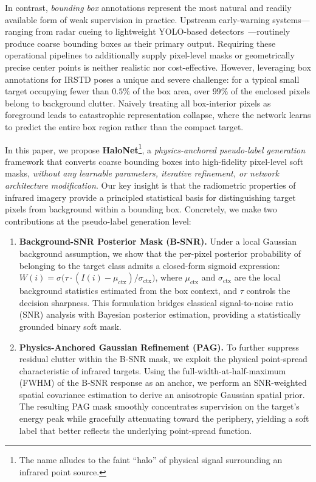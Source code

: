 In contrast, \emph{bounding box} annotations represent the most natural and readily available form of weak supervision in practice.
Upstream early-warning systems---ranging from radar cueing to lightweight YOLO-based detectors~\cite{yolo}---routinely produce coarse bounding boxes as their primary output.
Requiring these operational pipelines to additionally supply pixel-level masks or geometrically precise center points is neither realistic nor cost-effective.
However, leveraging box annotations for IRSTD poses a unique and severe challenge: for a typical small target occupying fewer than $0.5\%$ of the box area, over $99\%$ of the enclosed pixels belong to background clutter.
Naively treating all box-interior pixels as foreground leads to catastrophic representation collapse, where the network learns to predict the entire box region rather than the compact target.


In this paper, we propose \textbf{HaloNet}\footnote{The name alludes to the faint ``halo'' of physical signal surrounding an infrared point source.}, a \emph{physics-anchored pseudo-label generation} framework that converts coarse bounding boxes into high-fidelity pixel-level soft masks, \emph{without any learnable parameters, iterative refinement, or network architecture modification}.
Our key insight is that the radiometric properties of infrared imagery provide a principled statistical basis for distinguishing target pixels from background within a bounding box.
Concretely, we make two contributions at the pseudo-label generation level:

\begin{enumerate}
    \item \textbf{Background-SNR Posterior Mask (B-SNR).}
    Under a local Gaussian background assumption, we show that the per-pixel posterior probability of belonging to the target class admits a closed-form sigmoid expression:
    $W(i) = \sigma\bigl(\tau \cdot ({I(i) - \mu_\mathrm{ctx}})/{\sigma_\mathrm{ctx}}\bigr)$,
    where $\mu_\mathrm{ctx}$ and $\sigma_\mathrm{ctx}$ are the local background statistics estimated from the box context, and $\tau$ controls the decision sharpness.
    This formulation bridges classical signal-to-noise ratio (SNR) analysis with Bayesian posterior estimation, providing a statistically grounded binary soft mask.

    \item \textbf{Physics-Anchored Gaussian Refinement (PAG).}
    To further suppress residual clutter within the B-SNR mask, we exploit the physical point-spread characteristic of infrared targets.
    Using the full-width-at-half-maximum (FWHM) of the B-SNR response as an anchor, we perform an SNR-weighted spatial covariance estimation to derive an anisotropic Gaussian spatial prior.
    The resulting PAG mask smoothly concentrates supervision on the target's energy peak while gracefully attenuating toward the periphery, yielding a soft label that better reflects the underlying point-spread function.
\end{enumerate}

